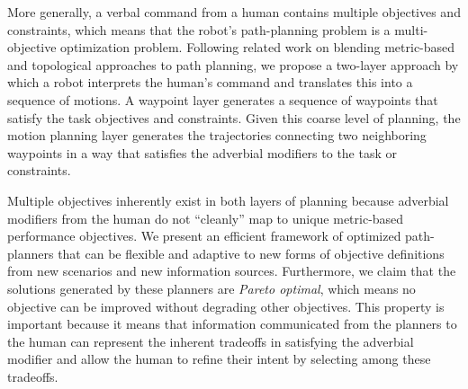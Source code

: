 \documentclass[12pt,a4paper]{article}
\begin{document}
More generally, a verbal command from a human contains multiple objectives and constraints, which means that the robot's path-planning problem is a multi-objective optimization problem. Following related work on blending metric-based and topological approaches to path planning, we propose a two-layer approach by which a robot interprets the human's command and translates this into a sequence of motions. A waypoint layer generates a sequence of waypoints that satisfy the task objectives and constraints. Given this coarse level of planning, the motion planning layer generates the trajectories connecting two neighboring waypoints in a way that satisfies the adverbial modifiers to the task or constraints.

Multiple objectives inherently exist in both layers of planning because adverbial modifiers from the human do not ``cleanly'' map to unique metric-based performance objectives. We present an efficient framework of optimized path-planners that can be flexible and adaptive to new forms of objective definitions from new scenarios and new information sources. Furthermore, we claim that the solutions generated by these planners are \emph{Pareto optimal}, which means no objective can be improved without degrading other objectives. This property is important because it means that information communicated from the planners to the human can represent the inherent tradeoffs in satisfying the adverbial modifier and allow the human to refine their intent by selecting among these tradeoffs.
\end{document}
